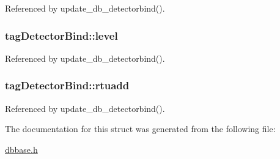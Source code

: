 Referenced by update\-\_\-db\-\_\-detectorbind().

\hypertarget{structtagDetectorBind_a16b0c6c94a3ebfbbca084d64c6108eca}{
\subsubsection[{level}]{ tag\-Detector\-Bind\-::level}}\label{structtagDetectorBind_a16b0c6c94a3ebfbbca084d64c6108eca}


Referenced by update\-\_\-db\-\_\-detectorbind().

\hypertarget{structtagDetectorBind_a19401ce86e9371f1130ed048d0bf085f}{
\subsubsection[{rtuadd}]{ tag\-Detector\-Bind\-::rtuadd}}\label{structtagDetectorBind_a19401ce86e9371f1130ed048d0bf085f}


Referenced by update\-\_\-db\-\_\-detectorbind().



The documentation for this struct was generated from the following file\-:\begin{DoxyCompactItemize}
\item 
\hyperlink{dbbase_8h}{dbbase.\-h}\end{DoxyCompactItemize}
